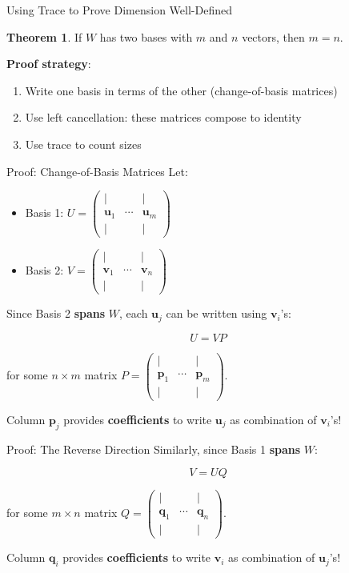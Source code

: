 \documentclass[10pt]{beamer}
\theoremstyle{definition}
\newtheorem{thm}{Theorem}[section]
\newcommand{\x}[1]{\alert{\textbf{#1}}}
\begin{document}
\begin{frame}{Using Trace to Prove Dimension Well-Defined}
\begin{thm}
If $W$ has two bases with $m$ and $n$ vectors, then $m = n$.
\end{thm}

\vfill
\textbf{Proof strategy}:
\begin{enumerate}
\item Write one basis in terms of the other (change-of-basis matrices)
\item Use left cancellation: these matrices compose to identity
\item Use trace to count sizes
\end{enumerate}
\end{frame}

\begin{frame}{Proof: Change-of-Basis Matrices}
Let:
\begin{itemize}
\item Basis 1: $U = \begin{pmatrix} | & & | \\ \mathbf{u}_1 & \cdots & \mathbf{u}_m \\ | & & | \end{pmatrix}$
\item Basis 2: $V = \begin{pmatrix} | & & | \\ \mathbf{v}_1 & \cdots & \mathbf{v}_n \\ | & & | \end{pmatrix}$
\end{itemize}

\vfill
Since Basis 2 \x{spans} $W$, each $\mathbf{u}_j$ can be written using $\mathbf{v}_i$'s:

$$U = V P$$

for some $n \times m$ matrix $P = \begin{pmatrix} | & & | \\ \mathbf{p}_1 & \cdots & \mathbf{p}_m \\ | & & | \end{pmatrix}$.

\vfill
Column $\mathbf{p}_j$ provides \x{coefficients} to write $\mathbf{u}_j$ as combination of $\mathbf{v}_i$'s!
\end{frame}

\begin{frame}{Proof: The Reverse Direction}
Similarly, since Basis 1 \x{spans} $W$:

$$V = U Q$$

for some $m \times n$ matrix $Q = \begin{pmatrix} | & & | \\ \mathbf{q}_1 & \cdots & \mathbf{q}_n \\ | & & | \end{pmatrix}$.

\vfill
Column $\mathbf{q}_i$ provides \x{coefficients} to write $\mathbf{v}_i$ as combination of $\mathbf{u}_j$'s!
\end{frame}
\end{document}
